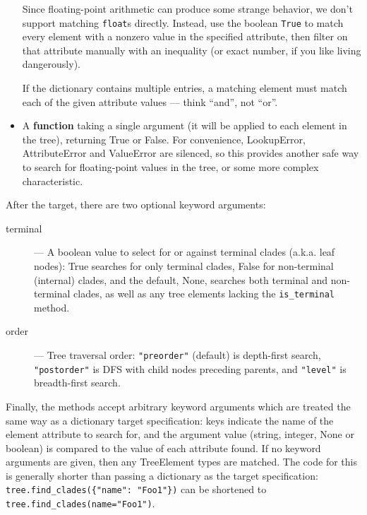 \documentclass{report}
\begin{document}
\begin{itemize}
\begin{itemize}
    \end{itemize}

    Since floating-point arithmetic can produce some strange behavior, we don't support
    matching \texttt{float}s directly. Instead, use the boolean \texttt{True} to match every
    element with a nonzero value in the specified attribute, then filter on that attribute
    manually with an inequality (or exact number, if you like living dangerously).

    If the dictionary contains multiple entries, a matching element must match each of the
    given attribute values --- think ``and'', not ``or''.

  \item A \textbf{function} taking a single argument (it will be applied to each element in the
    tree), returning True or False. For convenience, LookupError, AttributeError and ValueError
    are silenced, so this provides another safe way to search for floating-point values in the
    tree, or some more complex characteristic.

\end{itemize}

After the target, there are two optional keyword arguments:

\begin{description}
  \item[terminal] --- A boolean value to select for or against terminal clades (a.k.a. leaf
    nodes): True searches for only terminal clades, False for non-terminal (internal) clades,
    and the default, None, searches both terminal and non-terminal clades, as well as any tree
    elements lacking the \verb|is_terminal| method.

  \item[order] --- Tree traversal order: \texttt{"preorder"} (default) is depth-first search,
    \texttt{"postorder"} is DFS with child nodes preceding parents, and \texttt{"level"} is
    breadth-first search.

\end{description}

Finally, the methods accept arbitrary keyword arguments which are treated the same way as a
dictionary target specification: keys indicate the name of the element attribute to search for,
and the argument value (string, integer, None or boolean) is compared to the value of each
attribute found. If no keyword arguments are given, then any TreeElement types are matched.
The code for this is generally shorter than passing a dictionary as the target specification:
\verb|tree.find_clades({"name": "Foo1"})| can be shortened to
\verb|tree.find_clades(name="Foo1")|.
\end{document}
